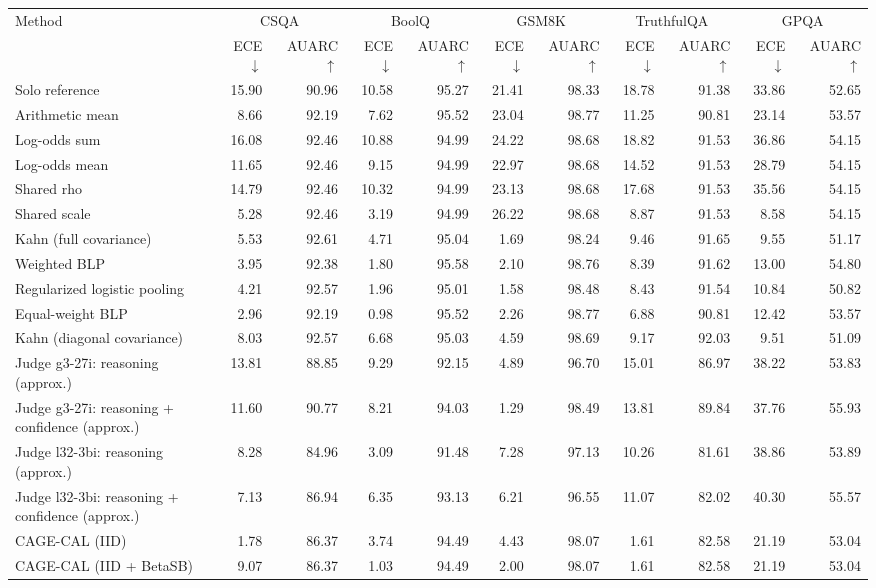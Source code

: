 \begin{tabular}{lrrrrrrrrrr}
\toprule
Method & \multicolumn{2}{c}{CSQA} & \multicolumn{2}{c}{BoolQ} & \multicolumn{2}{c}{GSM8K} & \multicolumn{2}{c}{TruthfulQA} & \multicolumn{2}{c}{GPQA} \\
 & ECE $\downarrow$ & AUARC $\uparrow$ & ECE $\downarrow$ & AUARC $\uparrow$ & ECE $\downarrow$ & AUARC $\uparrow$ & ECE $\downarrow$ & AUARC $\uparrow$ & ECE $\downarrow$ & AUARC $\uparrow$ \\
\midrule
Solo reference & 15.90 & 90.96 & 10.58 & 95.27 & 21.41 & 98.33 & 18.78 & 91.38 & 33.86 & 52.65 \\
Arithmetic mean & 8.66 & 92.19 & 7.62 & 95.52 & 23.04 & 98.77 & 11.25 & 90.81 & 23.14 & 53.57 \\
Log-odds sum & 16.08 & 92.46 & 10.88 & 94.99 & 24.22 & 98.68 & 18.82 & 91.53 & 36.86 & 54.15 \\
Log-odds mean & 11.65 & 92.46 & 9.15 & 94.99 & 22.97 & 98.68 & 14.52 & 91.53 & 28.79 & 54.15 \\
Shared rho & 14.79 & 92.46 & 10.32 & 94.99 & 23.13 & 98.68 & 17.68 & 91.53 & 35.56 & 54.15 \\
Shared scale & 5.28 & 92.46 & 3.19 & 94.99 & 26.22 & 98.68 & 8.87 & 91.53 & 8.58 & 54.15 \\
Kahn (full covariance) & 5.53 & 92.61 & 4.71 & 95.04 & 1.69 & 98.24 & 9.46 & 91.65 & 9.55 & 51.17 \\
Weighted BLP & 3.95 & 92.38 & 1.80 & 95.58 & 2.10 & 98.76 & 8.39 & 91.62 & 13.00 & 54.80 \\
Regularized logistic pooling & 4.21 & 92.57 & 1.96 & 95.01 & 1.58 & 98.48 & 8.43 & 91.54 & 10.84 & 50.82 \\
Equal-weight BLP & 2.96 & 92.19 & 0.98 & 95.52 & 2.26 & 98.77 & 6.88 & 90.81 & 12.42 & 53.57 \\
Kahn (diagonal covariance) & 8.03 & 92.57 & 6.68 & 95.03 & 4.59 & 98.69 & 9.17 & 92.03 & 9.51 & 51.09 \\
Judge g3-27i: reasoning (approx.) & 13.81 & 88.85 & 9.29 & 92.15 & 4.89 & 96.70 & 15.01 & 86.97 & 38.22 & 53.83 \\
Judge g3-27i: reasoning + confidence (approx.) & 11.60 & 90.77 & 8.21 & 94.03 & 1.29 & 98.49 & 13.81 & 89.84 & 37.76 & 55.93 \\
Judge l32-3bi: reasoning (approx.) & 8.28 & 84.96 & 3.09 & 91.48 & 7.28 & 97.13 & 10.26 & 81.61 & 38.86 & 53.89 \\
Judge l32-3bi: reasoning + confidence (approx.) & 7.13 & 86.94 & 6.35 & 93.13 & 6.21 & 96.55 & 11.07 & 82.02 & 40.30 & 55.57 \\
CAGE-CAL (IID) & 1.78 & 86.37 & 3.74 & 94.49 & 4.43 & 98.07 & 1.61 & 82.58 & 21.19 & 53.04 \\
CAGE-CAL (IID + BetaSB) & 9.07 & 86.37 & 1.03 & 94.49 & 2.00 & 98.07 & 1.61 & 82.58 & 21.19 & 53.04 \\
\bottomrule
\end{tabular}
